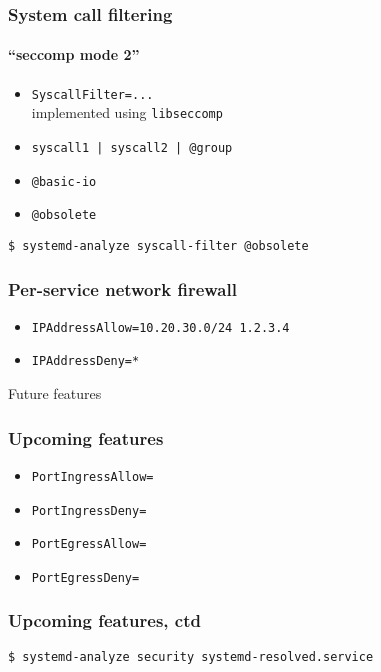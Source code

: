 \documentclass[serif]{beamer}
\begin{document}
\begin{frame}[fragile]
  \frametitle{System call filtering}
  \framesubtitle{``seccomp mode 2''}

  \pause

  \begin{itemize}
  \item \texttt{SyscallFilter=...}\\
        implemented using \texttt{libseccomp}
  \item \texttt{syscall1 | syscall2 | @group}
  \item \texttt{@basic-io}
  \item \texttt{@obsolete}
  \end{itemize}

  \medskip
  \pause

  \begin{verbatim}
$ systemd-analyze syscall-filter @obsolete
  \end{verbatim}
\end{frame}

\begin{frame}
  \frametitle{Per-service network firewall}

  \begin{itemize}
  \item \texttt{IPAddressAllow=\color{gray}10.20.30.0/24 1.2.3.4}
  \item \texttt{IPAddressDeny=\color{gray}*}
  \end{itemize}
\end{frame}

\begin{frame}[c]
  \Huge{Future features}
\end{frame}

\begin{frame}
  \frametitle{Upcoming features}

  \begin{itemize}
  \item \texttt{PortIngressAllow=}
  \item \texttt{PortIngressDeny=}
  \item \texttt{PortEgressAllow=}
  \item \texttt{PortEgressDeny=}
  \end{itemize}
\end{frame}

\begin{frame}[fragile]
  \frametitle{Upcoming features, ctd}

  \begin{verbatim}
$ systemd-analyze security systemd-resolved.service
  \end{verbatim}
\end{frame}
\end{document}
